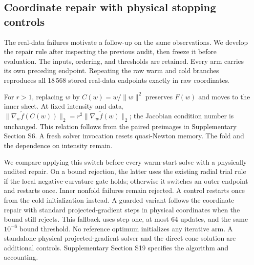 \subsection{Coordinate repair with physical stopping controls}
\label{sec:chartrepair}
The real-data failures motivate a follow-up on the same observations. We develop the repair rule after inspecting the previous audit, then freeze it before evaluation. The inputs, ordering, and thresholds are retained. Every arm carries its own preceding endpoint. Repeating the raw warm and cold branches reproduces all 18\,568 stored real-data endpoints exactly in raw coordinates.

For $r>1$, replacing $w$ by $C(w)=w/\|w\|^2$ preserves $F(w)$ and moves to the inner sheet. At fixed intensity and data, $\|\nabla_w\widetilde f(C(w))\|_2=r^2\|\nabla_w\widetilde f(w)\|_2$; the Jacobian condition number is unchanged. This relation follows from the paired preimages in Supplementary Section S6. A fresh solver invocation resets quasi-Newton memory. The fold and the dependence on intensity remain.

We compare applying this switch before every warm-start solve with a physically audited repair. On a bound rejection, the latter uses the existing radial trial rule if the local negative-curvature gate holds; otherwise it switches an outer endpoint and restarts once. Inner nonfold failures remain rejected. A control restarts once from the cold initialization instead. A guarded variant follows the coordinate repair with standard projected-gradient steps in physical coordinates when the bound still rejects. This fallback uses step one, at most 64 updates, and the same $10^{-6}$ bound threshold. No reference optimum initializes any iterative arm. A standalone physical projected-gradient solver and the direct cone solution are additional controls. Supplementary Section S19 specifies the algorithm and accounting.

